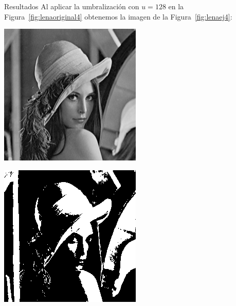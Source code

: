 \documentclass{beamer}
\begin{document}
\begin{frame}[fragile]{Resultados}
	\justifying
	Al aplicar la umbralización con $u=128$ en la Figura~\ref{fig:lenaoriginal4} obtenemos la imagen de la Figura~\ref{fig:lenaej4}:
	\vspace{0.5cm}
	
	\centering
	\begin{minipage}{0.45\linewidth}
		\centering
		\includegraphics[width=\linewidth]{../results/lena_original}
		\label{fig:lenaoriginal4}
	\end{minipage}\hfill
	\begin{minipage}{0.45\linewidth}
		\centering
		\includegraphics[width=\linewidth]{../results/lena_ej4}
		\label{fig:lenaej4}
	\end{minipage}
\end{frame}
\end{document}
